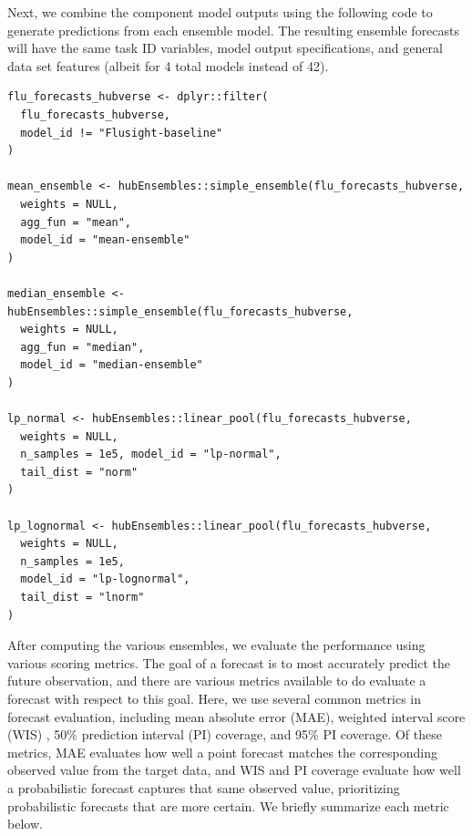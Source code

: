\documentclass[
  article,
  shortnames,
  notitle]{jss}
\begin{document}
Next, we combine the component model outputs using the following code to
generate predictions from each ensemble model. The resulting ensemble
forecasts will have the same task ID variables, model output
specifications, and general data set features (albeit for 4 total models
instead of 42).

\begin{verbatim}
flu_forecasts_hubverse <- dplyr::filter(
  flu_forecasts_hubverse,
  model_id != "Flusight-baseline"
)

mean_ensemble <- hubEnsembles::simple_ensemble(flu_forecasts_hubverse,
  weights = NULL,
  agg_fun = "mean",
  model_id = "mean-ensemble"
)

median_ensemble <- hubEnsembles::simple_ensemble(flu_forecasts_hubverse,
  weights = NULL,
  agg_fun = "median",
  model_id = "median-ensemble"
)

lp_normal <- hubEnsembles::linear_pool(flu_forecasts_hubverse,
  weights = NULL,
  n_samples = 1e5, model_id = "lp-normal",
  tail_dist = "norm"
)

lp_lognormal <- hubEnsembles::linear_pool(flu_forecasts_hubverse,
  weights = NULL,
  n_samples = 1e5,
  model_id = "lp-lognormal",
  tail_dist = "lnorm"
)
\end{verbatim}

After computing the various ensembles, we evaluate the performance using
various scoring metrics. The goal of a forecast is to most accurately
predict the future observation, and there are various metrics available
to do evaluate a forecast with respect to this goal. Here, we use
several common metrics in forecast evaluation, including mean absolute
error (MAE), weighted interval score (WIS)
\citep{bracher_evaluating_2021}, 50\% prediction interval (PI) coverage,
and 95\% PI coverage. Of these metrics, MAE evaluates how well a point
forecast matches the corresponding observed value from the target data,
and WIS and PI coverage evaluate how well a probabilistic forecast
captures that same observed value, prioritizing probabilistic forecasts
that are more certain. We briefly summarize each metric below.
\end{document}

